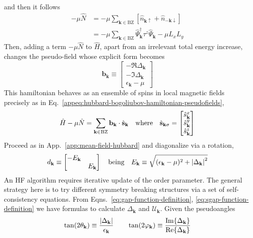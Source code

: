 and then it follows
\[
\begin{aligned}
	-\mu\hat N &= -\mu \sum_{\mathbf{k} \in \mathrm{BZ}} \left[ \hat n_{\mathbf{k}\uparrow} + \hat n_{-\mathbf{k}\downarrow} \right] \\
	&= -\mu \sum_{\mathbf{k} \in \mathrm{BZ}} \hat \Psi_\mathbf{k}^\dagger \tau^z \hat \Psi_\mathbf{k} -\mu L_x L_y
\end{aligned}
\]
Then, adding a term $-\mu \hat N$ to $\hat H$, apart from an irrelevant total energy increase, changes the pseudo-field whose explicit form becomes
\begin{equation} \label{eq:extended-hubbard-pseudo-magnetic-field}
	\mathbf{b}_\mathbf{k} \equiv \begin{bmatrix}
		-\Re{\Delta_\mathbf{k}} \\
		-\Im{\Delta_\mathbf{k}} \\ \epsilon_\mathbf{k} - \mu
	\end{bmatrix}
\end{equation}
This hamiltonian behaves as an ensemble of spins in local magnetic fields precisely as in Eq.~\eqref{appeq:hubbard-bogoliubov-hamiltonian-pseudofields},
\begin{equation}\label{eq:extended-hubbard-bogoliubov-hamiltonian-pseudofields}
	\hat H -\mu \hat N = \sum_{\mathbf{k} \in \mathrm{BZ}} \mathbf{b}_\mathbf{k} \cdot \hat{\mathbf{s}}_\mathbf{k}
	\qq{where}
	\hat{\mathbf{s}}_{\mathbf{k}\sigma} = \begin{bmatrix}
		\hat s_\mathbf{k}^x \\
		\hat s_\mathbf{k}^y \\
		\hat s_\mathbf{k}^z
	\end{bmatrix}
\end{equation}
Proceed as in App.~\ref{app:mean-field-hubbard} and diagonalize via a rotation,
\[
	d_\mathbf{k} \equiv \begin{bmatrix}
		-E_\mathbf{k} & \\ & E_\mathbf{k}
	\end{bmatrix}
	\qq{being}
	E_\mathbf{k} \equiv \sqrt{(\epsilon_\mathbf{k}-\mu)^2 + \abs{\Delta_\mathbf{k}}^2}
\]
An HF algorithm requires iterative update of the order parameter. The general strategy here is to try different symmetry breaking structures via a set of self-consistency equations. From Eqns.~\eqref{eq:gap-function-definition}, \eqref{eq:sgap-function-definition} we have formulas to calculate $\Delta_\mathbf{k}$ and $\mathcal{U}_\mathbf{k}$. Given the pseudoangles
\[
	\tan(2\theta_\mathbf{k}) \equiv \frac{\abs{\Delta_\mathbf{k}}}{\epsilon_\mathbf{k}}
	\qquad
	\tan(2\varphi_\mathbf{k}) \equiv \frac{\Im{\Delta_\mathbf{k}}}{\Re{\Delta_\mathbf{k}}}
\]
